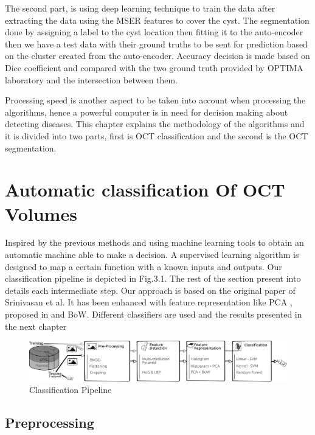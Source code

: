 The second part, is using deep learning technique to train the data after extracting the data using the MSER features to cover the cyst.
The segmentation done by assigning a label to the cyst location then fitting it to the auto-encoder then we have a test data with their ground truths to be sent for prediction based on the cluster created from the auto-encoder.
Accuracy decision is made based on Dice coefficient and compared with the two ground truth provided by OPTIMA laboratory and the intersection between them.  

Processing speed is another aspect to be taken into account when processing the algorithms, hence a powerful computer is in need for decision making about detecting diseases.
This chapter explains the methodology of the algorithms and it is divided into two parts, first is OCT classification and the second is the OCT segmentation. 

\section{Automatic classification Of OCT Volumes}

Inspired by the previous methods and using machine learning tools to obtain an automatic machine able to make a decision.
A supervised learning algorithm is designed to map a certain function with a known inputs and outputs.  
Our classification pipeline is depicted in Fig.3.1.
The rest of the section present into details each intermediate step.
Our approach is based on the original paper of Srinivasan et al\cite{srinivasan2014fully}.
It has been enhanced with feature representation like PCA , proposed in  \cite{venhuizen2015automated} and BoW.
Different classifiers are used and the results presented in the next chapter

\begin{figure}[htb]
        \centering
        \includegraphics[width = 1.2\textwidth]{figures/Khaled-ICPR-method.png} %
  \caption{Classification Pipeline}
  \label{fig:Classification Pipeline}
\end{figure} 

\subsection{Preprocessing}

